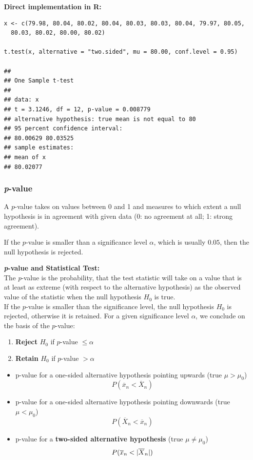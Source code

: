 \documentclass[11pt]{article}
\newcommand*\samplemean[1]{\overline{#1}}
\DeclarePairedDelimiter\abs{\lvert}{\rvert}
\begin{document}
\noindent
\textbf{Direct implementation in R:}\\
\begin{verbatim}
x <- c(79.98, 80.04, 80.02, 80.04, 80.03, 80.03, 80.04, 79.97, 80.05, 
  80.03, 80.02, 80.00, 80.02)

t.test(x, alternative = "two.sided", mu = 80.00, conf.level = 0.95)

##
## One Sample t-test
##
## data: x
## t = 3.1246, df = 12, p-value = 0.008779
## alternative hypothesis: true mean is not equal to 80
## 95 percent confidence interval:
## 80.00629 80.03525
## sample estimates:
## mean of x
## 80.02077
\end{verbatim}


\subsubsection{\textit{p}-value}
A $p$-value takes on values between 0 and 1 and measures to which extent a null hypothesis
is in agreement with given data (0: no agreement at all; 1: strong agreement).

If the $p$-value is smaller than a significance level $\alpha$, which is usually $0.05$, then the null hypothesis is rejected.

\begin{definition}
	\textbf{\textit{p}-value and Statistical Test:}\\
	The \textit{p}-value is the probability, that the test statistic will take on a value that is at least as extreme (with respect to the alternative hypothesis) as the observed value of the statistic when the null hypothesis $H_0$ is true.\\
	
	\noindent
	If the $p$-value is smaller than the significance level, the null hypothesis $H_0$ is rejected, otherwise it is retained. For a given significance level $\alpha$, we conclude on the basis of the $p$-value:
	\begin{enumerate}
		\item \textbf{Reject} $H_0$ if $p$-value $\leq \alpha$
		\item \textbf{Retain} $H_0$ if $p$-value $> \alpha$
	\end{enumerate}
\end{definition}
\begin{itemize}
	\item p-value for a one-sided alternative hypothesis pointing upwards (true $\mu > \mu_0$)
	\begin{equation*}
		P(\samplemean{x}_{n} < \samplemean{X}_{n})
	\end{equation*}
	\item p-value for a one-sided alternative hypothesis pointing downwards (true $\mu < \mu_0$)
	\begin{equation*}
		P(\samplemean{X}_{n} < \samplemean{x}_{n})
	\end{equation*}
	\item p-value for a \textbf{two-sided alternative hypothesis} (true $\mu \neq \mu_0$)
	\begin{equation*}
		P(\samplemean{x}_{n} < \abs{\samplemean{X}_{n}})
	\end{equation*}
\end{itemize}
\end{document}
